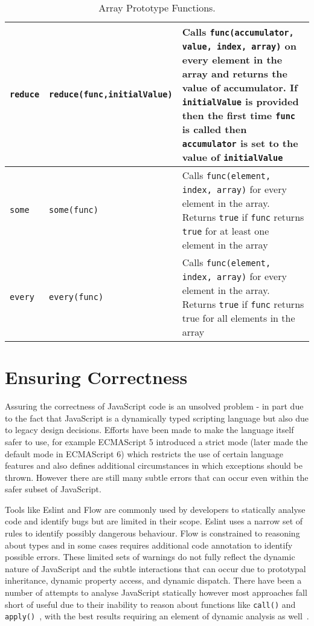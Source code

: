 \documentclass[]{final_report}
\begin{document}
\begin{table}[t]
\begin{tabular}{|p{2cm}|p{4.2cm}|p{9cm}|}
\lstinline|reduce| & {\lstinline|reduce(func,initialValue)|} & Calls {\lstinline|func(accumulator, value, index, array)|} on every element in the array and returns the value of accumulator. If {\lstinline|initialValue|} is provided then the first time {\lstinline|func|} is called then {\lstinline|accumulator|} is set to the value of {\lstinline|initialValue|} \\ \hline
\lstinline|some| & {\lstinline|some(func)|} & Calls {\lstinline|func(element, index, array)|} for every element in the array. Returns \lstinline|true| if {\lstinline|func|} returns \lstinline|true| for at least one element in the array \\ \hline
\lstinline|every| & {\lstinline|every(func)|} & Calls {\lstinline|func(element, index, array)|} for every element in the array. Returns \lstinline|true| if {\lstinline|func|} returns true for all elements in the array \\ \hline
\end{tabular}
\caption{Array Prototype Functions.}
\label{table:array-prototype}
\end{table}

\section{Ensuring Correctness}
Assuring the correctness of JavaScript code is an unsolved problem - in part due to the fact that JavaScript is a dynamically typed scripting language but also due to legacy design decisions. Efforts have been made to make the language itself safer to use, for example ECMAScript 5 introduced a strict mode (later made the default mode in ECMAScript 6) which restricts the use of certain language features and also defines additional circumstances in which exceptions should be thrown. However there are still many subtle errors that can occur even within the safer subset of JavaScript.

Tools like Eslint and Flow are commonly used by developers to statically analyse code and identify bugs but are limited in their scope. Eslint uses a narrow set of rules to identify possibly dangerous behaviour. Flow is constrained to reasoning about types and in some cases requires additional code annotation to identify possible errors. These limited sets of warnings do not fully reflect the dynamic nature of JavaScript and the subtle interactions that can occur due to prototypal inheritance, dynamic property access, and dynamic dispatch. There have been a number of attempts to analyse JavaScript statically however most approaches fall short of useful due to their inability to reason about functions like \lstinline{call()} and \lstinline{apply()}~\cite{sridharan2012correlation}, with the best results requiring an element of dynamic analysis as well~\cite{logozzo2010rata, wei2013practical}.
\end{document}
